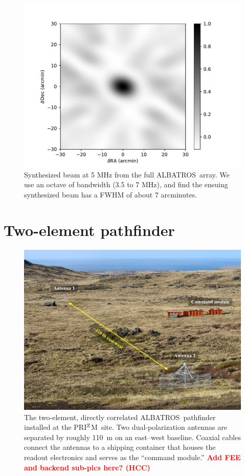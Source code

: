 \documentclass{ws-jai}
\def\albatros{ALBATROS}
\def\prizm{PRI$^{\rm Z}$M}
\newcommand{\attention}[1]{\textcolor{red}{\bf {#1}}}
\begin{document}
\begin{figure}
  \begin{center}
    \includegraphics[width=0.7\linewidth]{Figures/marion_beam_huts_2020.pdf}
    \caption{Synthesized beam at 5 MHz from the full \albatros\ array.
      We use an octave of bandwidth (3.5 to 7 MHz), and find the
      ensuing synthesized beam has a FWHM of about 7 arcminutes.}
    \label{Fig:beam}
  \end{center}
\end{figure}


\section{Two-element pathfinder}

\begin{figure}
  \begin{center}
    \includegraphics[width=0.7\linewidth]{Figures/albatros_2elem/albatros_2elem.pdf}
    \caption{The two-element, directly correlated
      \albatros\ pathfinder installed at the \prizm\ site.  Two
      dual-polarization antennas are separated by roughly 110~m on an
      east--west baseline. Coaxial cables connect the antennas to a
      shipping container that houses the readout electronics and
      serves as the ``command module.'' \attention{Add FEE
        and backend sub-pics here? (HCC)}}
    \label{Fig:albatros2}
  \end{center}
\end{figure}
\end{document}
